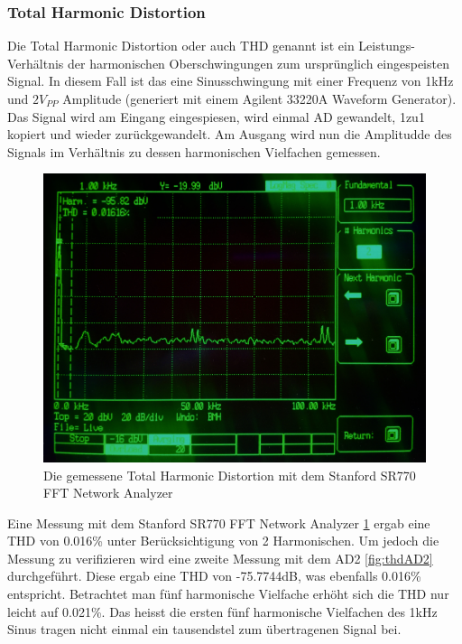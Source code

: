 \subsubsection{Total Harmonic Distortion}
\label{subsubsec:Total Harmonic Distortion}
Die Total Harmonic Distortion oder auch THD genannt ist ein Leistungs-Verhältnis der harmonischen Oberschwingungen zum ursprünglich  eingespeisten Signal. In diesem Fall ist das eine Sinusschwingung mit einer Frequenz von 1kHz und $2V_{PP}$ Amplitude (generiert mit einem Agilent 33220A Waveform Generator). Das Signal wird am Eingang eingespiesen, wird einmal AD gewandelt, 1zu1 kopiert und wieder zurückgewandelt. Am Ausgang wird nun die Amplitudde des Signals im Verhältnis zu dessen harmonischen Vielfachen gemessen.

\begin{figure} [H]
\begin{center}
 \includegraphics[scale=0.1]{../graphics/THD.jpg}
 \caption{Die gemessene Total Harmonic Distortion mit dem Stanford SR770 FFT Network Analyzer}
\label{fig:thd}
\end{center}
\end{figure}

Eine Messung mit dem Stanford SR770 FFT Network Analyzer \ref{fig:thd} ergab eine THD von 0.016\% unter Berücksichtigung von 2 Harmonischen.
Um jedoch die Messung zu verifizieren wird eine zweite Messung mit dem AD2 \ref{fig:thdAD2}  durchgeführt. Diese ergab eine THD von -75.7744dB, was ebenfalls 0.016\% entspricht. Betrachtet man fünf harmonische Vielfache erhöht sich die THD nur leicht auf 0.021\%. Das heisst die ersten fünf harmonische Vielfachen des 1kHz Sinus tragen nicht einmal ein tausendstel zum übertragenen Signal bei.

